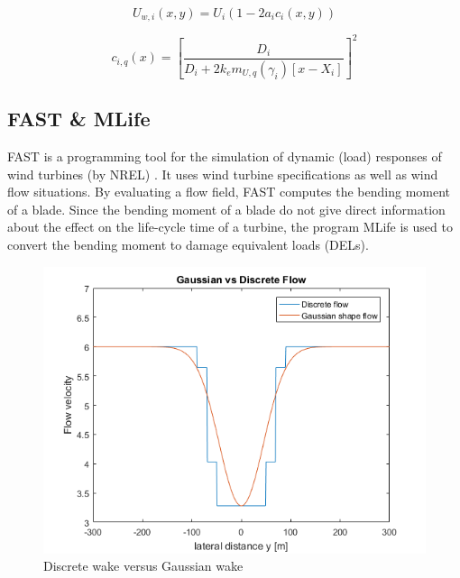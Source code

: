 \begin{equation}
\label{eq:Uw}
U_{w,i}(x,y) = U_i\left( {1-2a_ic_i(x,y)} \right)
\end{equation} 

\begin{equation}
\label{eq:c}
c_{i,q}(x) = \left[ \frac{D_i}{D_i + 2k_em_{U,q}(\gamma_i)[x - X_i]} \right]^2
\end{equation}




\subsection{FAST \& MLife} FAST is a programming tool for the simulation of dynamic (load) responses of wind turbines (by NREL) \cite{Jonkman2005}. It uses wind turbine specifications as well as wind flow situations. By evaluating a flow field, FAST computes the bending moment of a blade. Since the bending moment of a blade do not give direct information about the effect on the life-cycle time of a turbine, the program MLife is used to convert the bending moment to damage equivalent loads (DELs). 

\begin{figure}
  \includegraphics[width=\linewidth]{./Figures/PlotGausDiscWakeDWake180U6yaw0.png} %
  \caption{Discrete wake versus Gaussian wake} %
  \label{fig:disgaus}
\end{figure}

